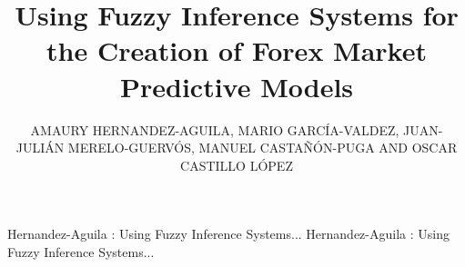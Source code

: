\documentclass{ieeeaccess}
\begin{document}

\title{Using Fuzzy Inference Systems for the Creation of Forex Market Predictive Models}
\author{
    \uppercase{Amaury Hernandez-Aguila,
    Mario Garc\'{i}a-Valdez,
    Juan-Juli\'{A}n Merelo-Guerv\'{o}s,
    Manuel Casta\~{n}\'{o}n-Puga and
    Oscar Castillo L\'{o}pez}}

\address[1]{National Technological Institute of Mexico, Calzada Del Tecnol\'{o}gico s/n, Fraccionamiento Tomas Aquino, Tijuana, BC 22414 Mexico (e-mail: {amerhag,mario,ocastillo}@tectijuana.edu.mx)}
\address[2]{University of Granada, Campus Aynadamar Daniel Saucedo Aranda s/n, Granada 18071, 80523 Spain (e-mail: jmerelo@geneura.ugr.es)}
\address[3]{Autonomous University of Baja California, Calzada Universidad 14418, Tijuana, BC, 22390, Mexico (e-mail: puga@uabc.edu.mx)}

\markboth
{Hernandez-Aguila \headeretal: Using Fuzzy Inference Systems... }
{Hernandez-Aguila \headeretal: Using Fuzzy Inference Systems... }

\end{document}
